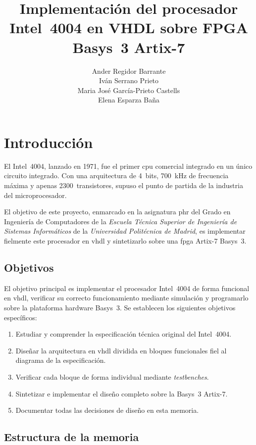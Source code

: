 \documentclass[%
    school=etsisi,%
    type=pfg,%
    degree=61CI,%
]{upm-report}
\title{Implementación del procesador Intel~4004 en VHDL sobre FPGA Basys~3 Artix-7}
\author{%
    Ander Regidor Barrante\\
    Iván Serrano Prieto\\
    Maria José García-Prieto Castells\\
    Elena Esparza Baña%
}
\begin{document}
\chapter{Introducción}
\label{ch:introduccion}


El Intel~4004, lanzado en 1971, fue el primer \acrfull{cpu} comercial
integrado en un único circuito integrado.  Con una arquitectura de 4~bits,
700~kHz de frecuencia máxima y apenas 2300~transistores, supuso el punto de
partida de la industria del microprocesador.

El objetivo de este proyecto, enmarcado en la asignatura
\acrfull{phr} del Grado en Ingeniería de Computadores de la
\textit{Escuela Técnica Superior de Ingeniería de Sistemas Informáticos} de la
\textit{Universidad Politécnica de Madrid}, es implementar fielmente este
procesador en \acrshort{vhdl} y sintetizarlo sobre una \acrshort{fpga}
Artix-7 Basys~3.

\section{Objetivos}

El objetivo principal es implementar el procesador Intel~4004 de forma
funcional en \acrshort{vhdl}, verificar su correcto funcionamiento mediante
simulación y programarlo sobre la plataforma hardware Basys~3.  Se establecen
los siguientes objetivos específicos:

\begin{enumerate}
    \item Estudiar y comprender la especificación técnica original del
        Intel~4004.
    \item Diseñar la arquitectura en \acrshort{vhdl} dividida en bloques
        funcionales fiel al diagrama de la especificación.
    \item Verificar cada bloque de forma individual mediante \textit{testbenches}.
    \item Sintetizar e implementar el diseño completo sobre la Basys~3 Artix-7.
    \item Documentar todas las decisiones de diseño en esta memoria.
\end{enumerate}

\section{Estructura de la memoria}
\end{document}
